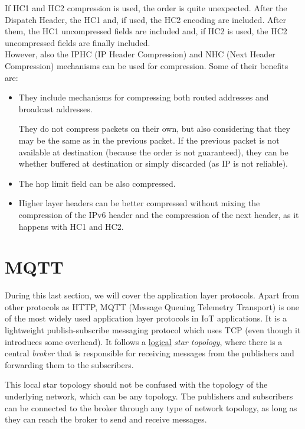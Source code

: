 If HC1 and HC2 compression is used, the order is quite unexpected. After the Dispatch Header, the HC1 and, if used, the HC2 encoding are included. After them, the HC1 uncompressed fields are included and, if HC2 is used, the HC2 uncompressed fields are finally included.\\

However, also the IPHC (IP Header Compression) and NHC (Next Header Compression) mechanisms can be used for compression. Some of their benefits are:
\begin{itemize}
    \item They include mechanisms for compressing both routed addresses and broadcast addresses.
    
    They do not compress packets on their own, but also considering that they may be the same as in the previous packet. If the previous packet is not available at destination (because the order is not guaranteed), they can be whether buffered at destination or simply discarded (as IP is not reliable).

    \item The hop limit field can be also  compressed.
    \item Higher layer headers can be better compressed without mixing the compression of the IPv6 header and the compression of the next header, as it happens with HC1 and HC2.
\end{itemize}








\section{MQTT}

During this last section, we will cover the application layer protocols. Apart from other protocols as HTTP, MQTT (Message Queuing Telemetry Transport) is one of the most widely used application layer protocols in IoT applications. It is a lightweight publish-subscribe messaging protocol which uses TCP (even though it introduces some overhead). It follows a \ul{logical} \emph{star topology}, where there is a central \emph{broker} that is responsible for receiving messages from the publishers and forwarding them to the subscribers.
\begin{observacion}
    This local star topology should not be confused with the topology of the underlying network, which can be any topology. The publishers and subscribers can be connected to the broker through any type of network topology, as long as they can reach the broker to send and receive messages.
\end{observacion}

